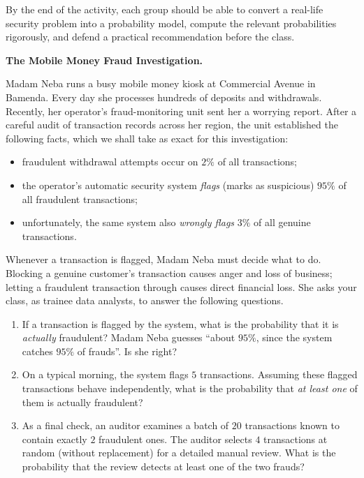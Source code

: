 \documentclass[11pt]{article}
\newcounter{popsec}
\newcounter{popsub}
\newcommand{\courssub}[1]{%
  \stepcounter{popsub}%
  \par\vspace{9pt}\noindent{\popxbold\fontsize{11.5}{13}\selectfont\color{popink}{\color{poporange}\thepopsec.\thepopsub}\hspace{6pt}#1}\par\nopagebreak\vspace{4pt}
}
\begin{document}
By the end of the activity, each group should be able to convert a real-life security problem into a probability model, compute the relevant probabilities rigorously, and defend a practical recommendation before the class.

\courssub{Situation}

\textbf{The Mobile Money Fraud Investigation.}\par

Madam Neba runs a busy mobile money kiosk at Commercial Avenue in Bamenda. Every day she processes hundreds of deposits and withdrawals. Recently, her operator's fraud-monitoring unit sent her a worrying report. After a careful audit of transaction records across her region, the unit established the following facts, which we shall take as exact for this investigation:

\begin{itemize}
\item fraudulent withdrawal attempts occur on $2\%$ of all transactions;
\item the operator's automatic security system \emph{flags} (marks as suspicious) $95\%$ of all fraudulent transactions;
\item unfortunately, the same system also \emph{wrongly flags} $3\%$ of all genuine transactions.
\end{itemize}

Whenever a transaction is flagged, Madam Neba must decide what to do. Blocking a genuine customer's transaction causes anger and loss of business; letting a fraudulent transaction through causes direct financial loss. She asks your class, as trainee data analysts, to answer the following questions.

\begin{enumerate}
\item If a transaction is flagged by the system, what is the probability that it is \emph{actually} fraudulent? Madam Neba guesses ``about $95\%$, since the system catches $95\%$ of frauds''. Is she right?
\item On a typical morning, the system flags $5$ transactions. Assuming these flagged transactions behave independently, what is the probability that \emph{at least one} of them is actually fraudulent?
\item As a final check, an auditor examines a batch of $20$ transactions known to contain exactly $2$ fraudulent ones. The auditor selects $4$ transactions at random (without replacement) for a detailed manual review. What is the probability that the review detects at least one of the two frauds?
\end{enumerate}
\end{document}

